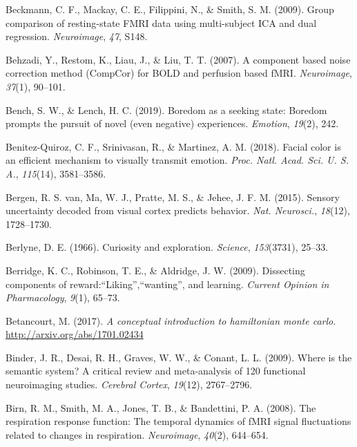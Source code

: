 \documentclass[11pt,american,]{memoir} %
\begin{document}
\leavevmode\hypertarget{ref-Beckmann2009-rs}{}%
Beckmann, C. F., Mackay, C. E., Filippini, N., \& Smith, S. M. (2009). Group comparison of resting-state FMRI data using multi-subject ICA and dual regression. \emph{Neuroimage}, \emph{47}, S148.

\leavevmode\hypertarget{ref-Behzadi2007-eb}{}%
Behzadi, Y., Restom, K., Liau, J., \& Liu, T. T. (2007). A component based noise correction method (CompCor) for BOLD and perfusion based fMRI. \emph{Neuroimage}, \emph{37}(1), 90--101.

\leavevmode\hypertarget{ref-bench2019boredom}{}%
Bench, S. W., \& Lench, H. C. (2019). Boredom as a seeking state: Boredom prompts the pursuit of novel (even negative) experiences. \emph{Emotion}, \emph{19}(2), 242.

\leavevmode\hypertarget{ref-Benitez-Quiroz2018-vr}{}%
Benitez-Quiroz, C. F., Srinivasan, R., \& Martinez, A. M. (2018). Facial color is an efficient mechanism to visually transmit emotion. \emph{Proc. Natl. Acad. Sci. U. S. A.}, \emph{115}(14), 3581--3586.

\leavevmode\hypertarget{ref-Van_Bergen2015-kl}{}%
Bergen, R. S. van, Ma, W. J., Pratte, M. S., \& Jehee, J. F. M. (2015). Sensory uncertainty decoded from visual cortex predicts behavior. \emph{Nat. Neurosci.}, \emph{18}(12), 1728--1730.

\leavevmode\hypertarget{ref-berlyne1966curiosity}{}%
Berlyne, D. E. (1966). Curiosity and exploration. \emph{Science}, \emph{153}(3731), 25--33.

\leavevmode\hypertarget{ref-berridge2009dissecting}{}%
Berridge, K. C., Robinson, T. E., \& Aldridge, J. W. (2009). Dissecting components of reward:``Liking'',``wanting'', and learning. \emph{Current Opinion in Pharmacology}, \emph{9}(1), 65--73.

\leavevmode\hypertarget{ref-Betancourt2017-rj}{}%
Betancourt, M. (2017). \emph{A conceptual introduction to hamiltonian monte carlo}. \url{http://arxiv.org/abs/1701.02434}

\leavevmode\hypertarget{ref-binder2009semantic}{}%
Binder, J. R., Desai, R. H., Graves, W. W., \& Conant, L. L. (2009). Where is the semantic system? A critical review and meta-analysis of 120 functional neuroimaging studies. \emph{Cerebral Cortex}, \emph{19}(12), 2767--2796.

\leavevmode\hypertarget{ref-Birn2008-ti}{}%
Birn, R. M., Smith, M. A., Jones, T. B., \& Bandettini, P. A. (2008). The respiration response function: The temporal dynamics of fMRI signal fluctuations related to changes in respiration. \emph{Neuroimage}, \emph{40}(2), 644--654.
\end{document}
